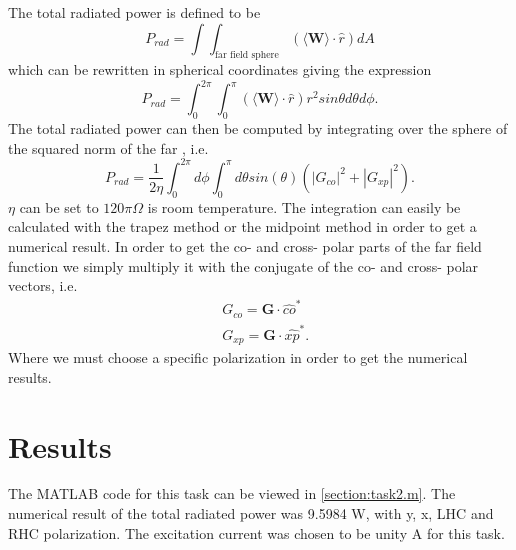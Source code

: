 The total radiated power is defined to be 
\begin{equation}
P_{rad} = \int \int_{\text{far field sphere}}(\langle\mathbf{W}\rangle \cdot \hat{r})dA
\end{equation}
which can be rewritten in spherical coordinates giving the expression 
\begin{equation}
P_{rad} = \int_{0}^{2\pi} \int_{0}^{\pi} (\langle\mathbf{W}\rangle \cdot \hat{r})r^2sin\theta d\theta d\phi.
\end{equation}
The total radiated power can then be computed by integrating over the sphere of the squared norm of the far , i.e. 
\begin{equation}
P_{rad} =\frac{1}{2 \eta} \int_0^{2\pi} d\phi \int_0^{\pi} d\theta sin(\theta)(|G_{co}|^2 + |G_{xp}|^2).
\end{equation}
$\eta$ can be set to $120\pi \Omega$ is room temperature. 
The integration can easily be calculated with the trapez  method or the midpoint method in order to get a numerical result. In order to get the co- and cross- polar parts of the far field function we simply multiply it with the conjugate of the co- and cross- polar vectors, i.e.
\begin{align}
& G_{co}  = \mathbf{G}\cdot \hat{co}^* \\
& G_{xp}  = \mathbf{G}\cdot \hat{xp}^*.
\end{align}
Where we must choose a specific polarization in order to get the numerical results.\cite{kildal2000foundations}
   

\section{Results}
The MATLAB code for this task can be viewed in \ref{section:task2.m}. The numerical result of the total radiated power was 9.5984 W, with y, x, LHC and RHC polarization. The excitation current was chosen to be unity A for this task.


